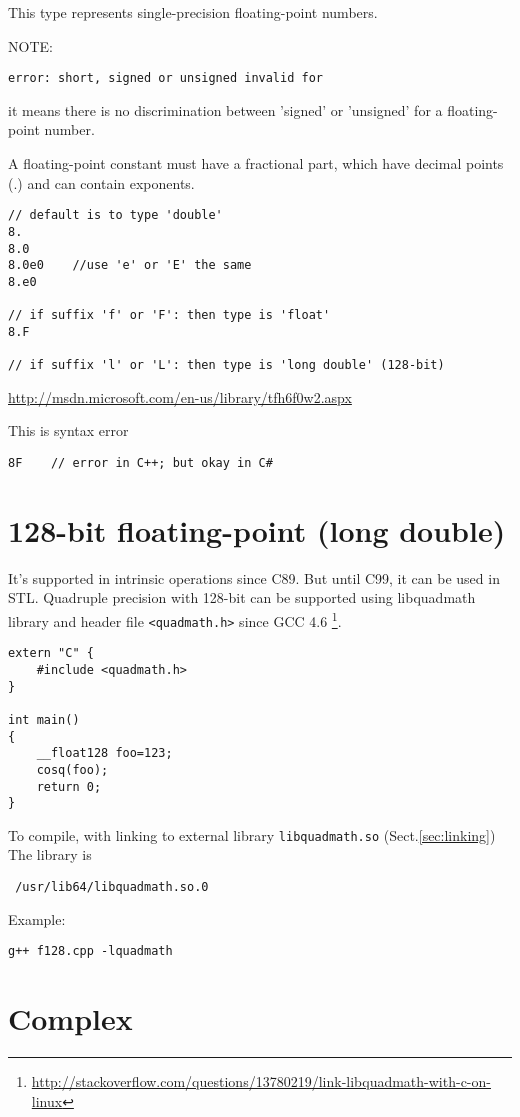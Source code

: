 This type represents single-precision floating-point numbers.

NOTE:
\begin{verbatim}
error: short, signed or unsigned invalid for 
\end{verbatim}
it means there is no discrimination between 'signed' or 'unsigned' for a
floating-point number.

A floating-point constant must have a fractional part, which have decimal points
(.) and can contain exponents.
\begin{verbatim}
// default is to type 'double'
8.
8.0
8.0e0    //use 'e' or 'E' the same
8.e0     

// if suffix 'f' or 'F': then type is 'float'
8.F

// if suffix 'l' or 'L': then type is 'long double' (128-bit)
\end{verbatim}
\url{http://msdn.microsoft.com/en-us/library/tfh6f0w2.aspx}

This is syntax error
\begin{verbatim}
8F    // error in C++; but okay in C#
\end{verbatim}

\section{128-bit floating-point (long double)}

It's supported in intrinsic operations since C89. But until C99, it can be used
in STL. Quadruple precision with 128-bit can be supported using libquadmath
library and header file \verb!<quadmath.h>! since GCC 4.6
\footnote{\url{http://stackoverflow.com/questions/13780219/link-libquadmath-with-c-on-linux}}.
\begin{lstlisting}
extern "C" {
    #include <quadmath.h>
}

int main()
{
    __float128 foo=123;
    cosq(foo);
    return 0;
}
\end{lstlisting}
To compile, with linking to external library \verb!libquadmath.so!
(Sect.\ref{sec:linking})
The library is 
\begin{verbatim}
 /usr/lib64/libquadmath.so.0
\end{verbatim}
Example:
\begin{verbatim}
g++ f128.cpp -lquadmath
\end{verbatim}



\section{Complex}
\label{sec:type-complex}
\label{sec:complex}

